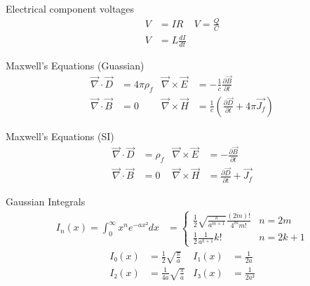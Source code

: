 \documentclass[avery5371]{flashcards}
\begin{document}


\begin{flashcard}{Electrical component voltages}
	\begin{align*}
		V &= IR		&	V = \frac{Q}{C} \\
		V &= L\frac{dI}{dt}
	\end{align*}
\end{flashcard}

\begin{flashcard}{Maxwell's Equations (Guassian)}
	\begin{align*}
		\vec ∇ · \vec D &= 4πρ_f
			& \vec ∇ × \vec E &= -\frac 1c \frac{∂\vec B}{∂t}
		\\
		\vec ∇ · \vec B &= 0
			& \vec ∇ × \vec H &= \frac 1c ( \frac{∂\vec D}{∂t} + 4π \vec{J_f} )
	\end{align*}
\end{flashcard}

\begin{flashcard}{Maxwell's Equations (SI)}
	\begin{align*}
		\vec ∇ · \vec D &= ρ_f
			& \vec ∇ × \vec E &= -\frac{∂\vec B}{∂t}
		\\
		\vec ∇ · \vec B &= 0
			& \vec ∇ × \vec H &= \frac{∂\vec D}{∂t} + \vec{J_f}
	\end{align*}
\end{flashcard}


\begin{flashcard}{Gaussian Integrals}
	\begin{align*}
		I_n(x) = \!\! ∫_0^∞ \!\! x^n e^{-ax²} dx &=
			\begin{cases}
				\displaystyle
				\frac{1}{2} \sqrt{\frac{π}{a^{m+1}}} \frac{(2m)!}{4^m m!}
					& \text{$n = 2m$} \\
				\displaystyle
				\frac{1}{2} \frac{1}{a^{k+1}} k!
					& \text{$n = 2k + 1$}
			\end{cases}
	\end{align*}
	\vspace{-\baselineskip}
	\begin{align*}
		I₀(x) &= \frac 12 \sqrt{\frac π a}
			& I₁(x) &= \frac 1 {2a} \\
		I₂(x) &= \frac{1}{4a} \sqrt{\frac π a}
			& I₃(x) &= \frac 1 {2a²}
	\end{align*}
\end{flashcard}
\end{document}
